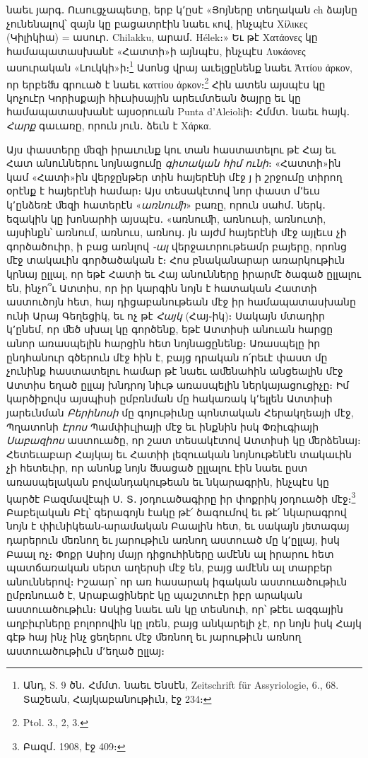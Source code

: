 \documentclass{article}
\begin{document}
{նաեւ յարգ․ Ուսուցչապետը, երբ կ՚ըսէ «Յոյները տեղական ch ձայնը չունենալով՝ զայն կը բացատրէին նաեւ κով, ինչպէս Χίλικες (Կիլիկիա) = ասուր․ Chilakku, արամ․ Hélek։» Եւ թէ Χατάονες կը համապատասխանէ «Հատտի»ի այնպէս, ինչպէս Λυκάονες ասուրական «Լուկկի»ի։\footnote{Անդ, S. 9 ծն․ Հմմտ․ նաեւ Ենսէն, Zeitschrift für Assyriologie, 6., 68. Տաշեան, Հայկաբանութիւն, էջ 234։} Ասոնց վրայ աւելցընենք նաեւ Ἀττίου ἀρκον, որ երբեﬓ գրուած է նաեւ καττίου ἀρκον։\footnote{Ptol. 3., 2, 3.} Հին ատեն այսպէս կը կոչուէր Կորիսքայի հիւսիսային արեւմտեան ծայրը եւ կը համապատասխանէ այսօրուան Punta d'Aleioliի։ Հմմտ․ նաեւ հայկ․ \emph{Հարք} գաւառը, որուն յուն․ ձեւն է Χάρκα.

Այս փաստերը ﬔզի իրաւունք կու տան հաստատելու թէ Հայ եւ Հատ անուններու նոյնացումը \emph{գիտական հիմ ունի}։ «Հատտի»ին կամ «Հատի»ին վերջընթեր տին հայերէնի մէջ յ ի շրջումը տիրող օրէնք է հայերէնի համար։ Այս տեսակէտով նոր փաստ մ՚եւս կ՚ընձեռէ ﬔզի հատերէն «\emph{առնուﬕ}» բառը, որուն սահմ․ ներկ․ եզակին կը խոնարհի այսպէս․ «առնուﬕ, առնուսի, առնուտի, այսինքն՝ առնում, առնուս, առնույ․ յն այժմ հայերէնի մէջ այլեւս չի գործածուիր, ի բաց առնլով \emph{֊ալ} վերջաւորութեամր բայերը, որոնց մէջ տակաւին գործածական է։ Հոս բնականարար առարկութիւն կրնայ ըլլալ, որ եթէ Հատի եւ Հայ անունները իրարմէ ծագած ըլլալու են, ինչո՞ւ Ատտիս, որ իր կարգին նոյն է հատական Հատտի աստուծոյն հետ, հայ դիցաբանութեան մէջ իր համապատասխանը ունի Արայ Գեղեցիկ, եւ ոչ թէ \emph{Հայկ} (Հայ֊իկ)։ Սակայն մտադիր կ՚ընեմ, որ ﬔծ սխալ կը գործենք, եթէ Ատտիսի անուան հարցը անոր առասպելին հարցին հետ նոյնացընենք։ Առասպելը իր ընդհանուր գծերուն մէջ հին է, բայց դրական ո՛րեւէ փաստ մը չունինք հաստատելու համար թէ նաեւ աﬔնահին անցեալին մէջ Ատտիս եղած ըլլայ խնդրոյ նիւթ առասպելին ներկայացուցիչը։ Իմ կարծիքովս այսպիսի ըմբռնման մը հակառակ կ՚ելլեն Ատտիսի յարեւնման \emph{Բերինոսի} մը գոյութիւնը պոնտական Հերակղեայի մէջ, Պղատոնի \emph{Էրոս} Պամփիւլիայի մէջ եւ ինքնին իսկ Փռիւգիայի \emph{Սաբազիոս} աստուածը, որ շատ տեսակէտով Ատտիսի կը ﬔրձենայ։ Հետեւաբար Հայկայ եւ Հատիի լեզուական նոյնութենէն տակաւին չի հետեւիր, որ անոնք նոյն ﬓացած ըլլալու էին նաեւ ըստ առասպելական բովանդակութեան եւ նկարագրին, ինչպէս կը կարծէ Բազմավէպի Ս․ Տ․ յօդուածագիրը իր փոքրիկ յօդուածի մէջ։\footnote{Բազմ․ 1908, էջ 409։} Բաբելական Բէլ՝ գերագոյն էակը թէ՛ ծագումով եւ թէ՛ նկարագրով նոյն է փիւնիկեան֊արամական Բաալին հետ, եւ սակայն յետագայ դարերուն ﬔռնող եւ յարութիւն առնող աստուած մը կ՚ըլլայ, իսկ Բաալ ոչ։ Փոքր Ասիոյ մայր դիցուհիները ամէնն ալ իրարու հետ պատճառական սերտ աղերսի մէջ են, բայց ամէնն ալ տարբեր անուններով։ Իշաար՝ որ առ հասարակ իգական աստուածութիւն ըմբռնուած է, Արաբացիներէ կը պաշտուէր իբր արական աստուածութիւն։ Ասկից նաեւ ան կը տեսնուի, որ՝ թէեւ ազգային աղբիւրները բոլորովին կը լռեն, բայց անկարելի չէ, որ նոյն իսկ Հայկ գէթ հայ ինչ ինչ ցեղերու մէջ ﬔռնող եւ յարութիւն առնող աստուածութիւն մ՚եղած ըլլայ։

}
\end{document}
